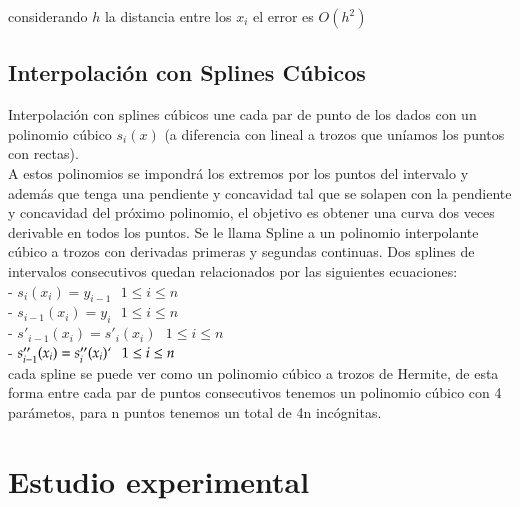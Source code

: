\documentclass{endm}
\begin{document}
considerando $h$ la distancia entre los $x_i$ el error es $O(h^{2})$

\subsection{Interpolación con Splines Cúbicos}


Interpolación con splines cúbicos une cada par de punto de los dados con un polinomio cúbico $s_i(x)$   (a diferencia con lineal a trozos que uníamos los puntos con rectas).\\
A estos polinomios se impondrá los extremos por los puntos del intervalo y además que tenga una pendiente y concavidad tal que se solapen con la pendiente y concavidad del próximo polinomio, el objetivo es obtener una curva dos veces derivable en todos los puntos.
Se le llama Spline a un polinomio interpolante cúbico a trozos con derivadas primeras y segundas continuas.
Dos splines de intervalos consecutivos quedan relacionados por las siguientes ecuaciones:\\
- $s_i(x_i) = y_{i-1} \  \  \ 1\leq  i \leq n$\\
- $s_{i-1}(x_i) = y_{i} \  \  \ 1\leq  i \leq n$\\
- $s'_{i-1}(x_i) = s'_{i}(x_i) \  \  \ 1\leq  i \leq n$\\
- $s''_{i-1}(x_i) = s''_{i}(x_i)` \  \  \ 1\leq  i \leq n$\\

cada spline se puede ver como un polinomio cúbico a trozos de Hermite, de esta forma entre cada par de puntos consecutivos tenemos un polinomio cúbico con 4 parámetos, para n puntos tenemos un total de 4n incógnitas.
\section{Estudio experimental}
\end{document}

